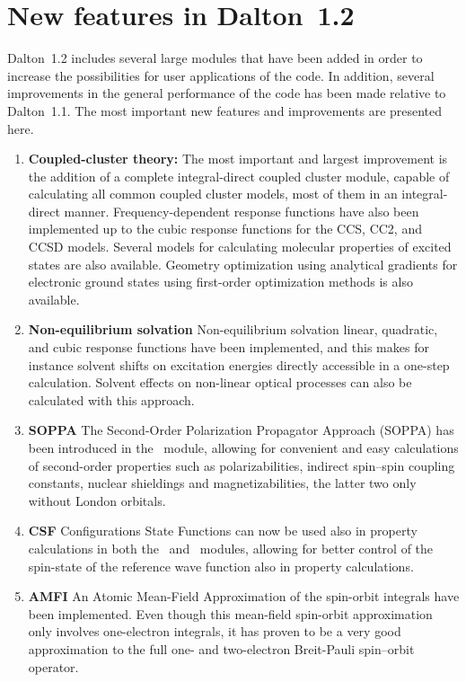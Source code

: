 \section{New features in Dalton~1.2}
Dalton~1.2 includes several large modules that have been added in order
to increase the possibilities for user applications of the code. In
addition, several improvements in the general performance of the code
has been made relative to Dalton~1.1. The most important new features
and improvements are presented here.

\begin{enumerate}
\item {\bf Coupled-cluster theory:} The most important and largest
improvement is the addition of
a complete integral-direct coupled cluster module, capable of
calculating all common coupled cluster models, most of them in an
integral-direct manner. Frequency-dependent response functions have
also been implemented up to the cubic response functions for the CCS,
CC2, and CCSD models. Several models for calculating molecular
properties of excited states are also available. Geometry optimization
using analytical gradients for electronic ground states using
first-order optimization methods is also available.

\item {\bf Non-equilibrium solvation} Non-equilibrium
solvation linear, quadratic, and cubic response functions have been
implemented, and this
makes for instance solvent shifts on excitation energies directly
accessible in a one-step calculation. Solvent effects on non-linear
optical processes can also be calculated with this approach.

\item {\bf SOPPA} The Second-Order Polarization Propagator Approach (SOPPA) has
been introduced in the \aba\ module, allowing for convenient and easy
calculations of second-order properties such as polarizabilities,
indirect spin--spin coupling constants, nuclear shieldings and
magnetizabilities, the latter two only without London orbitals.

\item {\bf CSF} Configurations State Functions can now be used also in
property calculations in both the \resp\ and \aba\ modules, allowing
for better control of the spin-state of the reference wave function
also in property calculations.

\item {\bf AMFI} An Atomic Mean-Field Approximation of the spin-orbit
integrals have been implemented. Even though this mean-field
spin-orbit approximation only involves one-electron integrals, it has
proven to be a very good approximation to the full one- and
two-electron Breit-Pauli spin--orbit operator.


\end{enumerate}
